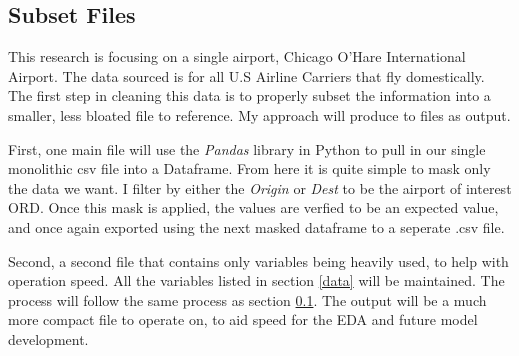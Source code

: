 \documentclass[a4paper,11pt]{article}
\begin{document}
\subsection{Subset Files} \label{datasubset}
This research is focusing on a single airport, Chicago O'Hare International Airport. The data sourced is for all U.S Airline Carriers that fly domestically.
The first step in cleaning this data is to properly subset the information into a smaller, less bloated file to reference. My approach will produce to files as output.

First, one main file will use the \emph{Pandas} library in Python to pull in our single monolithic csv file into a Dataframe. From here it is quite simple to mask only the data we want.
I filter by either the \emph{Origin} or \emph{Dest} to be the airport of interest ORD.
Once this mask is applied, the values are verfied to be an expected value, and once again exported using the next masked dataframe to a seperate .csv file. 

Second, a second file that contains only variables being heavily used, to help with operation speed. All the variables listed in section \ref{data} will be maintained.
The process will follow the same process as section \ref{datasubset}. The output will be a much more compact file to operate on, to aid speed for the EDA and future model development.
\end{document}
